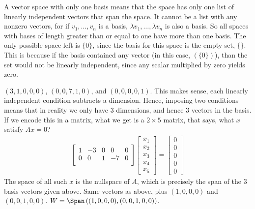 \documentclass{book}
\begin{document}
  \begin{enumerate}[label=\arabic*)]
    \ii A vector space with only one basis means that the space has only one list of linearly independent vectors that span the space. It cannot be a list with any nonzero
    vectors, for if $v_1, \dots, v_n$ is a basis, $\lambda v_1, \dots, \lambda v_n$ is also a basis. So all spaces with bases of length greater than or equal to one have more
    than one basis. The only possible space left is $\{0\}$, since the basis for this space is the empty set, $\{\}$. This is because if the basis contained any vector (in
    this case, $(\{0\})$), than the set would not be linearly independent, since any scalar multiplied by zero yields zero.
    \addtocounter{enumi}{1}
    \ii 
    \begin{enumerate}[label=\alph*)]
      \ii $(3, 1, 0, 0, 0)$, $(0, 0, 7, 1, 0)$, and $(0, 0, 0, 0, 1)$. This makes sense, each linearly independent condition subtracts a dimension. Hence, imposing two
      conditions means that in reality we only have 3 dimensions, and hence 3 vectors in the basis. If we encode this in a matrix, what we get is a $2\times5$ matrix, that
      says, what $x$ satisfy $Ax = 0$?
      \begin{align*}
        \begin{bmatrix}
          1 & -3 & 0 & 0 & 0 \\
          0 & 0 & 1 & -7 & 0 \\
        \end{bmatrix}
        \begin{bmatrix}
          x_1 \\ x_2 \\ x_3 \\ x_4 \\ x_5
        \end{bmatrix}
        =
        \begin{bmatrix}
          0 \\ 0 \\ 0 \\ 0 \\ 0
        \end{bmatrix}
      \end{align*}
      The space of all such $x$ is the nullspace of $A$, which is precisely the span of the 3 basis vectors given above. 
      \ii Same vectors as above, plus $(1, 0, 0, 0)$ and $(0, 0, 1, 0, 0)$.
      \ii $W = \Span\left((1, 0, 0, 0), (0, 0, 1, 0, 0)\right)$.
    \end{enumerate}
    \ii 
      \begin{enumerate}[label=\alph*)]

\end{enumerate}
\end{enumerate}
\end{document}
